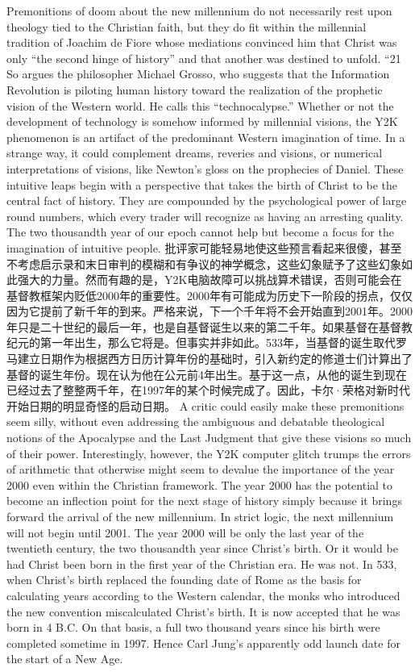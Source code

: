 \begin{paracol}{2}
Premonitions of doom about the new millennium do not necessarily rest upon theology tied to the Christian faith, but they do fit within the millennial tradition of Joachim de Fiore whose mediations convinced him that Christ was only ``the second hinge of history'' and that another was destined to unfold. ``21 So argues the philosopher Michael Grosso, who suggests that the Information Revolution is piloting human history toward the realization of the prophetic vision of the Western world. He calls this ``technocalypse.'' Whether or not the development of technology is somehow informed by millennial visions, the Y2K phenomenon is an artifact of the predominant Western imagination of time. In a strange way, it could complement dreams, reveries and visions, or numerical interpretations of visions, like Newton's gloss on the prophecies of Daniel. These intuitive leaps begin with a perspective that takes the birth of Christ to be the central fact of history. They are compounded by the psychological power of large round numbers, which every trader will recognize as having an arresting quality. The two thousandth year of our epoch cannot help but become a focus for the imagination of intuitive people.
\switchcolumn*
批评家可能轻易地使这些预言看起来很傻，甚至不考虑启示录和末日审判的模糊和有争议的神学概念，这些幻象赋予了这些幻象如此强大的力量。然而有趣的是，Y2K电脑故障可以挑战算术错误，否则可能会在基督教框架内贬低2000年的重要性。2000年有可能成为历史下一阶段的拐点，仅仅因为它提前了新千年的到来。严格来说，下一个千年将不会开始直到2001年。2000年只是二十世纪的最后一年，也是自基督诞生以来的第二千年。如果基督在基督教纪元的第一年出生，那么它将是。但事实并非如此。533年，当基督的诞生取代罗马建立日期作为根据西方日历计算年份的基础时，引入新约定的修道士们计算出了基督的诞生年份。现在认为他在公元前4年出生。基于这一点，从他的诞生到现在已经过去了整整两千年，在1997年的某个时候完成了。因此，卡尔·荣格对新时代开始日期的明显奇怪的启动日期。
\switchcolumn
A critic could easily make these premonitions seem silly, without even addressing the ambiguous and debatable theological notions of the Apocalypse and the Last Judgment that give these visions so much of their power. Interestingly, however, the Y2K computer glitch trumps the errors of arithmetic that otherwise might seem to devalue the importance of the year 2000 even within the Christian framework. The year 2000 has the potential to become an inflection point for the next stage of history simply because it brings forward the arrival of the new millennium. In strict logic, the next millennium will not begin until 2001. The year 2000 will be only the last year of the twentieth century, the two thousandth year since Christ's birth. Or it would be had Christ been born in the first year of the Christian era. He was not. In 533, when Christ's birth replaced the founding date of Rome as the basis for calculating years according to the Western calendar, the monks who introduced the new convention miscalculated Christ's birth. It is now accepted that he was born in 4 B.C. On that basis, a full two thousand years since his birth were completed sometime in 1997. Hence Carl Jung's apparently odd launch date for the start of a New Age.

\end{paracol}
